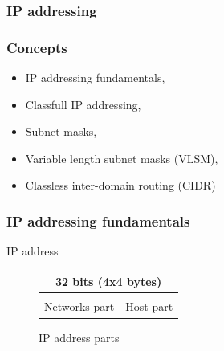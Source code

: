   \subsubsection{IP addressing}
  \begin{frame}
    \frametitle{Concepts}
      \begin{itemize}
        \item IP addressing fundamentals,\pause
        \item Classfull IP addressing,\pause
        \item Subnet masks,\pause
        \item Variable length subnet masks (VLSM),\pause
        \item Classless inter-domain routing (CIDR)
      \end{itemize}
  \end{frame}

  \begin{frame}
    \frametitle{IP addressing fundamentals}
    \begin{block}{IP address}
      \begin{figure}
        \centering
        \begin{tabular}{|c|c|}
          \multicolumn{2}{c}{32 bits (4x4 bytes)} \\ \hline
           & \\ \hline
          \color{brown}Networks part & \color{blue}Host part \\ \hline
        \end{tabular}
        \caption{IP address parts}
        \label{fig:inside_ip_address}
      \end{figure}
    \end{block}
  \end{frame}

